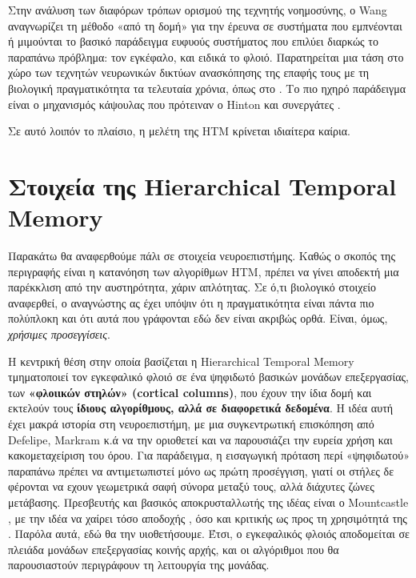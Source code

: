 	Στην ανάλυση των διαφόρων τρόπων ορισμού της τεχνητής νοημοσύνης, ο Wang \parencite{wangWhatYouMean2008} αναγνωρίζει τη μέθοδο
	«από τη δομή» για την έρευνα σε συστήματα που εμπνέονται ή μιμούνται
	το βασικό παράδειγμα ευφυούς συστήματος που επιλύει διαρκώς το παραπάνω πρόβλημα: τον εγκέφαλο, και ειδικά το φλοιό.
	Παρατηρείται μια τάση στο χώρο των τεχνητών νευρωνικών δικτύων ανασκόπησης της επαφής τους με τη βιολογική πραγματικότητα τα τελευταία χρόνια,
	όπως στο \cite{bengioBiologicallyPlausibleDeep2015}.
	Το πιο ηχηρό παράδειγμα είναι ο μηχανισμός κάψουλας που πρότειναν ο Hinton και συνεργάτες \parencite{sabourMatrixCapsulesEM2018,sabourDynamicRoutingCapsules2017}.
	\smallskip

	Σε αυτό λοιπόν το πλαίσιο, η μελέτη της HTM κρίνεται ιδιαίτερα καίρια.

\section{Στοιχεία της Hierarchical Temporal Memory}

	Παρακάτω θα αναφερθούμε πάλι σε στοιχεία νευροεπιστήμης.
	Καθώς ο σκοπός της περιγραφής είναι η κατανόηση των αλγορίθμων HTM, πρέπει να γίνει αποδεκτή μια παρέκκλιση από την αυστηρότητα, χάριν απλότητας.
	Σε ό,τι βιολογικό στοιχείο αναφερθεί, ο αναγνώστης ας έχει υπόψιν ότι η πραγματικότητα είναι πάντα πιο πολύπλοκη και ότι αυτά που γράφονται εδώ δεν είναι ακριβώς ορθά.
	Είναι, όμως, \textit{χρήσιμες προσεγγίσεις}.

	Η κεντρική θέση στην οποία βασίζεται η Hierarchical Temporal Memory τμηματοποιεί τον εγκεφαλικό φλοιό σε ένα ψηφιδωτό βασικών μονάδων επεξεργασίας,
	των \textbf{«φλοιικών στηλών» (cortical columns)},
	που έχουν την ίδια δομή και εκτελούν τους \textbf{ίδιους αλγορίθμους, αλλά σε διαφορετικά δεδομένα}.
	Η ιδέα αυτή έχει μακρά ιστορία στη νευροεπιστήμη, με μια συγκεντρωτική επισκόπηση από Defelipe, Markram κ.ά \cite{defelipeNeocorticalColumn2012}
	να την οριοθετεί και να παρουσιάζει την ευρεία χρήση και κακομεταχείριση του όρου.
	Για παράδειγμα, η εισαγωγική πρόταση περί «ψηφιδωτού» παραπάνω πρέπει να αντιμετωπιστεί μόνο ως πρώτη προσέγγιση,
	γιατί οι στήλες δε φέρονται να εχουν γεωμετρικά σαφή σύνορα μεταξύ τους, αλλά διάχυτες ζώνες μετάβασης.
	Πρεσβευτής και βασικός αποκρυσταλλωτής της ιδέας είναι ο Mountcastle \parencite{mountcastleColumnarOrganizationNeocortex1997},
	με την ιδέα να χαίρει τόσο αποδοχής \parencite{haueisLifeCorticalColumn2016}, όσο και κριτικής ως προς τη χρησιμότητά της \parencite{hortonCorticalColumnStructure2005}.
	Παρόλα αυτά, εδώ θα την υιοθετήσουμε.
	Έτσι, ο εγκεφαλικός φλοιός αποδομείται σε πλειάδα μονάδων επεξεργασίας κοινής αρχής, και οι αλγόριθμοι που θα παρουσιαστούν περιγράφουν τη λειτουργία της μονάδας.

